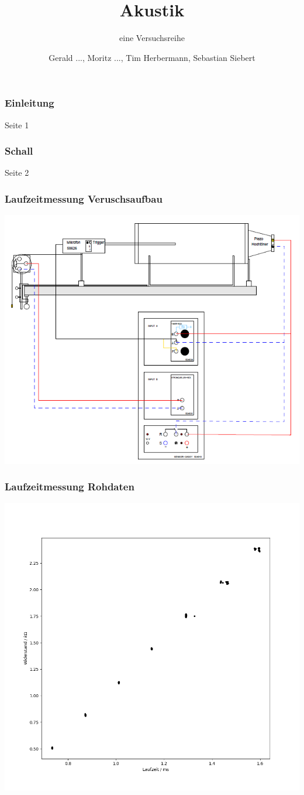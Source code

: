\documentclass[11pt]{beamer}
\begin{document}
	\author{Gerald ..., Moritz ..., Tim Herbermann, Sebastian Siebert}
	\title{Akustik}
	\subtitle{eine Versuchsreihe}
	\frame[plain]{\maketitle}
	
	\begin{frame}
		\frametitle{Einleitung}
		Seite 1
	\end{frame}
	\begin{frame}
		\frametitle{Schall}
		Seite 2
	\end{frame}
	\begin{frame}
		\frametitle{Laufzeitmessung \qquad Veruschsaufbau}
		\begin{center}
			\includegraphics[width=0.8\linewidth]{aufbau_laufzeitmessung}
		\end{center}
	\end{frame}
	\begin{frame}
		\frametitle{Laufzeitmessung \qquad Rohdaten}
		\begin{center}
			\includegraphics[width=0.8\linewidth]{rohdaten_laufzeit}
		\end{center}
	\end{frame}
\end{document}

